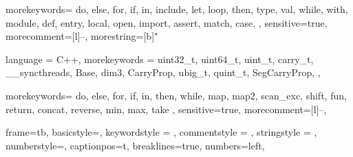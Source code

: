 
{
  morekeywords={
    do,
    else,
    for,
    if,
    in,
    include,
    let,
    loop,
    then,
    type,
    val,
    while,
    with,
    module,
    def,
    entry,
    local,
    open,
    import,
    assert,
    match,
    case,
  },
  sensitive=true, %
  morecomment=[l]{--}, %
  morestring=[b]" %
}

{
  language = C++,
  morekeywords = {
    uint32_t,
    uint64_t,
    uint_t,
    carry_t,
    __syncthreads,
    Base,
    dim3,
    CarryProp,
    ubig_t,
    quint_t,
    SegCarryProp,
  },
}

{
  morekeywords={
    do,
    else,
    for,
    if,
    in,
    then,
    while,
    map,
    map2,
    scan_exc,
    shift,
    fun,
    return,
    concat,
    reverse,
    min,
    max,
    take
  },
  sensitive=true,
  morecomment=[l]{--},
}

{
  frame=tb,
  basicstyle=\footnotesize\ttfamily,
  keywordstyle = \color{RoyalBlue},
  commentstyle = \color{ForestGreen},
  stringstyle = \color{purple},
  numberstyle=\scriptsize\color{darkgray},
  captionpos=t,
  breaklines=true,
  numbers=left,
}

\lstset{style=myStyle}

